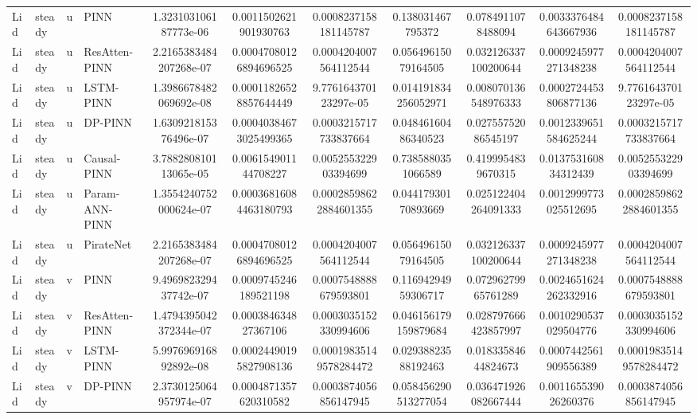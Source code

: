 \begin{landscape}
\begin{longtable}{llllccccccc}
\bottomrule
\endlastfoot
 Lid & steady &     u &           PINN &  1.323103106187773e-06 &  0.0011502621901930763 &  0.0008237158181145787 &    0.138031467795372 &    0.0784911078488094 & 0.0033376484643667936 &  0.0008237158181145787 \\
 Lid & steady &     u &  ResAtten-PINN & 2.2165383484207268e-07 & 0.00047080126894696525 &  0.0004204007564112544 &  0.05649615079164505 &  0.032126337100200644 & 0.0009245977271348238 &  0.0004204007564112544 \\
 Lid & steady &     u &      LSTM-PINN & 1.3986678482069692e-08 & 0.00011826528857644449 &  9.776164370123297e-05 & 0.014191834256052971 &  0.008070136548976333 & 0.0002724453806877136 &  9.776164370123297e-05 \\
 Lid & steady &     u &        DP-PINN &  1.630921815376496e-07 & 0.00040384673025499365 &  0.0003215717733837664 &  0.04846160486340523 &   0.02755752086545197 & 0.0012339651584625244 &  0.0003215717733837664 \\
 Lid & steady &     u &    Causal-PINN &  3.788280810113065e-05 &   0.006154901144708227 &   0.005255322903394699 &   0.7385880351066589 &    0.4199954839670315 &  0.013753160834312439 &   0.005255322903394699 \\
 Lid & steady &     u & Param-ANN-PINN & 1.3554240752000624e-07 & 0.00036816084463180793 & 0.00028598622884601355 &  0.04417930170893669 &  0.025122404264091333 & 0.0012999773025512695 & 0.00028598622884601355 \\
 Lid & steady &     u &      PirateNet & 2.2165383484207268e-07 & 0.00047080126894696525 &  0.0004204007564112544 &  0.05649615079164505 &  0.032126337100200644 & 0.0009245977271348238 &  0.0004204007564112544 \\
 Lid & steady &     v &           PINN &  9.496982329437742e-07 &  0.0009745246189521198 &  0.0007548888679593801 &  0.11694294959306717 &   0.07296279965761289 & 0.0024651624262332916 &  0.0007548888679593801 \\
 Lid & steady &     v &  ResAtten-PINN & 1.4794395042372344e-07 &   0.000384634827367106 &  0.0003035152330994606 & 0.046156179159879684 &  0.028797666423857997 & 0.0010290537029504776 &  0.0003035152330994606 \\
 Lid & steady &     v &      LSTM-PINN &  5.997696916892892e-08 & 0.00024490195827908136 & 0.00019835149578284472 &  0.02938823588192463 &   0.01833584644824673 & 0.0007442561909556389 & 0.00019835149578284472 \\
 Lid & steady &     v &        DP-PINN & 2.3730125064957974e-07 &  0.0004871357620310582 &  0.0003874056856147945 & 0.058456290513277054 &  0.036471926082667444 &  0.001165539026260376 &  0.0003874056856147945 \\

\end{longtable}
\end{landscape}
